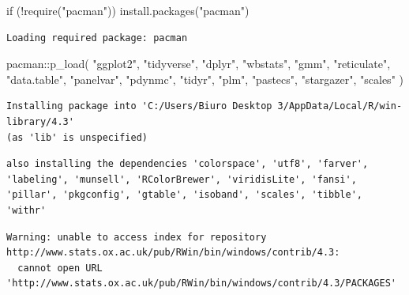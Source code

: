 \documentclass[
  11pt,
]{article}
\newenvironment{Shaded}{\begin{snugshade}}{\end{snugshade}}
\newcommand{\ControlFlowTok}[1]{\textcolor[rgb]{0.00,0.23,0.31}{#1}}
\newcommand{\FunctionTok}[1]{\textcolor[rgb]{0.28,0.35,0.67}{#1}}
\newcommand{\NormalTok}[1]{\textcolor[rgb]{0.00,0.23,0.31}{#1}}
\newcommand{\SpecialCharTok}[1]{\textcolor[rgb]{0.37,0.37,0.37}{#1}}
\newcommand{\StringTok}[1]{\textcolor[rgb]{0.13,0.47,0.30}{#1}}
\begin{document}
\begin{Shaded}
\begin{Highlighting}[]
\ControlFlowTok{if}\NormalTok{ (}\SpecialCharTok{!}\FunctionTok{require}\NormalTok{(}\StringTok{"pacman"}\NormalTok{)) }\FunctionTok{install.packages}\NormalTok{(}\StringTok{"pacman"}\NormalTok{)}
\end{Highlighting}
\end{Shaded}

\begin{verbatim}
Loading required package: pacman
\end{verbatim}

\begin{Shaded}
\begin{Highlighting}[]
\NormalTok{pacman}\SpecialCharTok{::}\FunctionTok{p\_load}\NormalTok{(                                }
               \StringTok{"ggplot2"}\NormalTok{,}
               \StringTok{"tidyverse"}\NormalTok{,}
               \StringTok{"dplyr"}\NormalTok{,}
               \StringTok{"wbstats"}\NormalTok{,}
               \StringTok{"gmm"}\NormalTok{,}
               \StringTok{"reticulate"}\NormalTok{,}
               \StringTok{"data.table"}\NormalTok{,}
               \StringTok{"panelvar"}\NormalTok{,}
               \StringTok{"pdynmc"}\NormalTok{,}
               \StringTok{"tidyr"}\NormalTok{,}
               \StringTok{"plm"}\NormalTok{,}
               \StringTok{"pastecs"}\NormalTok{,}
               \StringTok{"stargazer"}\NormalTok{,}
               \StringTok{"scales"}
\NormalTok{)}
\end{Highlighting}
\end{Shaded}

\begin{verbatim}
Installing package into 'C:/Users/Biuro Desktop 3/AppData/Local/R/win-library/4.3'
(as 'lib' is unspecified)
\end{verbatim}

\begin{verbatim}
also installing the dependencies 'colorspace', 'utf8', 'farver', 'labeling', 'munsell', 'RColorBrewer', 'viridisLite', 'fansi', 'pillar', 'pkgconfig', 'gtable', 'isoband', 'scales', 'tibble', 'withr'
\end{verbatim}

\begin{verbatim}
Warning: unable to access index for repository http://www.stats.ox.ac.uk/pub/RWin/bin/windows/contrib/4.3:
  cannot open URL 'http://www.stats.ox.ac.uk/pub/RWin/bin/windows/contrib/4.3/PACKAGES'
\end{verbatim}
\end{document}
